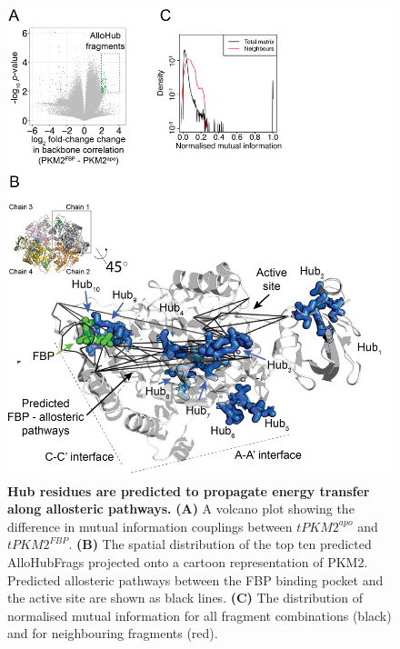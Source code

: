 \begin{figure}[!ht]
\includegraphics[scale=0.7]{ch6_fig13_allofraghubs.png}
\caption[Hub residues are predicted to propagate energy transfer along allosteric pathways.]{\textbf{Hub residues are predicted to propagate energy transfer along allosteric pathways.} \textbf{(A)} A volcano plot showing the difference in mutual information couplings between $tPKM2^{apo}$ and $tPKM2^{FBP}$. \textbf{(B)} The spatial distribution of the top ten predicted AlloHubFrags projected onto a cartoon representation of PKM2. Predicted allosteric pathways between the FBP binding pocket and the active site are shown as black lines. \textbf{(C)} The distribution of normalised mutual information for all fragment combinations (black) and for neighbouring fragments (red).}
\label{fig:allohub_identification}
\end{figure}
%
%
\clearpage

